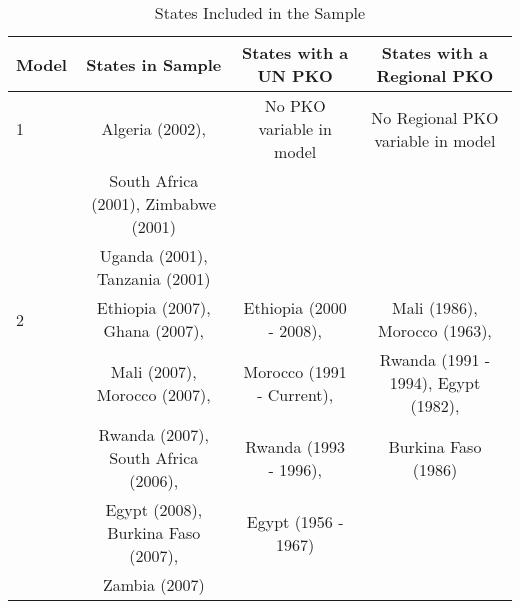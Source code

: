 \begin{table}[htbp!]\centering
\footnotesize
{\def\sym#1{\ifmmode^{#1}\else\(^{#1}\)\fi}
\caption{States Included in the Sample}
\begin{tabular}{l*{3}{c}}
\\
\hline\hline
Model    &   States in Sample                     &   States with a UN PKO      &  States with a Regional PKO \\
\hline
1        &   Algeria (2002),                      &    No PKO variable in model &  No Regional PKO variable in model   \\
         &   South Africa (2001), Zimbabwe (2001) &                                                                     \\
         &   Uganda (2001), Tanzania (2001)       &                                                                     \\
\hline
2        &   Ethiopia (2007), Ghana (2007),       &  Ethiopia (2000 - 2008),    &   Mali (1986), Morocco (1963),        \\
         &   Mali (2007), Morocco (2007),         &   Morocco (1991 - Current), &   Rwanda (1991 - 1994), Egypt (1982),   \\
         &   Rwanda (2007), South Africa (2006),  &   Rwanda (1993 - 1996),     &   Burkina Faso (1986)                    \\
         &   Egypt (2008), Burkina Faso (2007),   &   Egypt (1956 - 1967)       &                       \\
         &   Zambia (2007)                        &                               \\
\hline\hline
\end{tabular}
}
\end{table}
